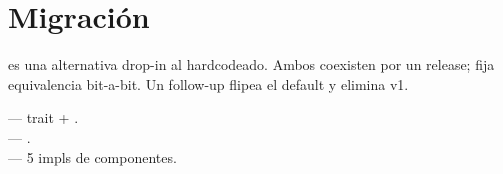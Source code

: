\section{Migración}

 es una alternativa drop-in
al  hardcodeado. Ambos coexisten por un
release; 
fija equivalencia bit-a-bit. Un follow-up flipea el default y
elimina v1.

\begin{inthecode}
 --- trait +
.\\
 ---
.\\
 --- 5
impls de componentes.
\end{inthecode}
